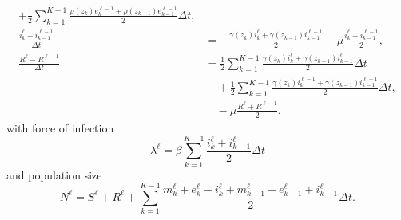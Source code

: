 \documentclass{jpmarticle}
\begin{document}
\begin{equation}
\begin{split}
    + \frac{1}{2} \sum_{k = 1}^{K - 1}
    \frac{\rho(z_k) e_k^{\ell - 1} + \rho(z_{k - 1}) e_{k - 1}^{\ell - 1}}{2}
    \Delta t,
    \\
    \frac{i_k^{\ell} - i_{k - 1}^{\ell - 1}}{\Delta t} &=
    - \frac{\gamma(z_k) i_k^{\ell} + \gamma(z_{k - 1}) i_{k - 1}^{\ell - 1}}{2}
    - \mu \frac{i_k^{\ell} + i_{k - 1}^{\ell - 1}}{2},
    \\
    \frac{R^{\ell} - R^{\ell - 1}}{\Delta t} &=
    \frac{1}{2} \sum_{k = 1}^{K - 1}
    \frac{\gamma(z_k) i_k^{\ell} + \gamma(z_{k - 1}) i_{k - 1}^{\ell}}{2}
    \Delta t
    \\ & \quad {}
    + \frac{1}{2} \sum_{k = 1}^{K - 1}
    \frac{\gamma(z_k) i_k^{\ell - 1} + \gamma(z_{k - 1}) i_{k - 1}^{\ell - 1}}{2}
    \Delta t,
    \\ & \quad {}
    - \mu \frac{R^{\ell} + R^{\ell - 1}}{2},
  \end{split}
\end{equation}
with force of infection
\begin{equation}
  \lambda^{\ell} =
  \beta \sum_{k = 1}^{K - 1}
  \frac{i_k^{\ell} + i_{k - 1}^{\ell}}{2}
  \Delta t
\end{equation}
and population size
\begin{equation}
  N^{\ell} =
  S^{\ell} + R^{\ell}
  + \sum_{k = 1}^{K - 1}
  \frac{m_k^{\ell} + e_k^{\ell} + i_k^{\ell} + m_{k - 1}^{\ell}
    + e_{k - 1}^{\ell} + i_{k - 1}^{\ell}}
  {2}
  \Delta t.
\end{equation}
\end{document}
